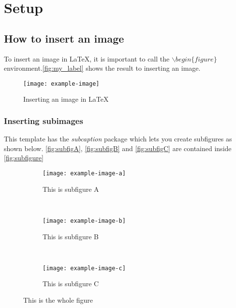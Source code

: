 \chapter{Setup}
\label{chap:3_setup}

\lipsum[2-4]

\section{How to insert an image}

To insert an image in \LaTeX{}, it is important to call the $\backslash begin\{figure\}$  environment.\autoref{fig:my_label} shows the result to inserting an image.

\begin{figure}[h]
    \centering
    \texttt{[image: example-image]}
    \caption{Inserting an image in \LaTeX}
    \label{fig:my_label}
\end{figure}

\subsection{Inserting subimages}

This template has the \textit{subcaption} package which lets you create subfigures as shown below. \autoref{fig:subfigA}, \autoref{fig:subfigB} and \autoref{fig:subfigC} are contained inside \autoref{fig:subfigure}


\begin{figure}[h]
    \begin{subfigure}{0.3\textwidth}
        \centering
        \texttt{[image: example-image-a]}
        \caption{This is subfigure A}
        \label{fig:subfigA}
    \end{subfigure}
    ~ 
    \begin{subfigure}{0.3\textwidth}
        \centering
        \texttt{[image: example-image-b]}
        \caption{This is subfigure B}
        \label{fig:subfigB}
    \end{subfigure}
     ~ 
    \begin{subfigure}{0.3\textwidth}
        \centering
        \texttt{[image: example-image-c]}
        \caption{This is subfigure C}
        \label{fig:subfigC}
    \end{subfigure}
    
    \caption{This is the whole figure}
    \label{fig:subfigure}
\end{figure}